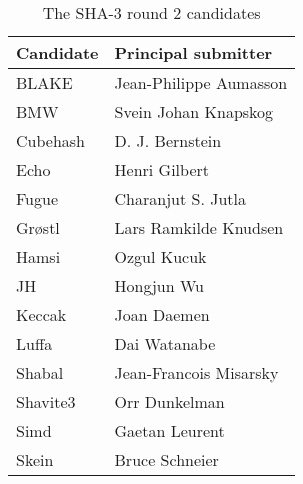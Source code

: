 \begin{table}
  \centering
  \caption{The SHA-3 round 2 candidates}
  \begin{tabular}{ | l | l | }
    \hline
    \textbf{Candidate} & \textbf{Principal submitter}  \\ \hline
     BLAKE       & Jean-Philippe Aumasson   \\ \hline
     \ac{BMW}    & Svein Johan Knapskog     \\ \hline
     Cubehash    & D. J. Bernstein          \\ \hline
     Echo        & Henri Gilbert            \\ \hline
     Fugue       & Charanjut S. Jutla       \\ \hline
     Grøstl      & Lars Ramkilde Knudsen    \\ \hline
     Hamsi       & Ozgul Kucuk              \\ \hline
     JH          & Hongjun  Wu              \\ \hline
     Keccak      & Joan Daemen              \\ \hline
     Luffa       & Dai Watanabe             \\ \hline
     Shabal      & Jean-Francois Misarsky   \\ \hline
     Shavite3    & Orr Dunkelman            \\ \hline
     Simd        & Gaetan Leurent           \\ \hline
     Skein       & Bruce Schneier           \\ \hline
  \end{tabular}
  \label{tbl:sha3:candidates}
\end{table}
